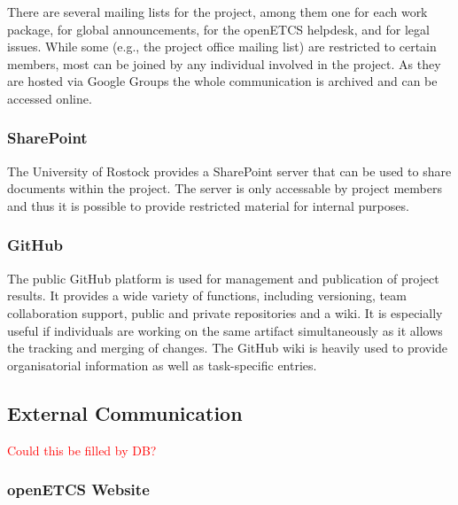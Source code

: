 There are several mailing lists for the project, among them one for each work package, for global announcements, for the openETCS helpdesk, and for legal issues. While some (e.g., the project office mailing list) are restricted to certain members, most can be joined by any individual involved in the project. As they are hosted via Google Groups the whole communication is archived and can be accessed online.

\subsubsection{SharePoint}

The University of Rostock provides a SharePoint server that can be used to share documents within the project. The server is only accessable by project members and thus it is possible to provide restricted material for internal purposes.

\subsubsection{GitHub}

The public GitHub platform is used for management and publication of project results. It provides a wide variety of functions, including versioning, team collaboration support, public and private repositories and a wiki. It is especially useful if individuals are working on the same artifact simultaneously as it allows the tracking and merging of changes. The GitHub wiki is heavily used to provide organisatorial information as well as task-specific entries.

\subsection{External Communication}
\textcolor{red}{Could this be filled by DB?}

\subsubsection{openETCS Website}


